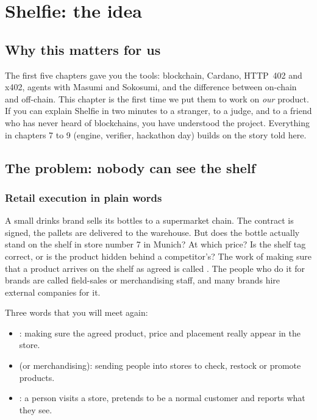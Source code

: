 \chapter{Shelfie: the idea}

\section*{Why this matters for us}
The first five chapters gave you the tools: blockchain, Cardano, HTTP~402 and x402, agents with Masumi and Sokosumi, and the difference between on-chain and off-chain. This chapter is the first time we put them to work on \emph{our} product. If you can explain Shelfie in two minutes to a stranger, to a judge, and to a friend who has never heard of blockchains, you have understood the project. Everything in chapters 7 to 9 (engine, verifier, hackathon day) builds on the story told here.

\section{The problem: nobody can see the shelf}

\subsection{Retail execution in plain words}
A small drinks brand sells its bottles to a supermarket chain. The contract is signed, the pallets are delivered to the warehouse. But does the bottle actually stand on the shelf in store number 7 in Munich? At which price? Is the shelf tag correct, or is the product hidden behind a competitor's? The work of making sure that a product arrives on the shelf as agreed is called . The people who do it for brands are called field-sales or merchandising staff, and many brands hire external companies for it.

Three words that you will meet again:
\begin{itemize}
  \item {}: making sure the agreed product, price and placement really appear in the store.
  \item {} (or merchandising): sending people into stores to check, restock or promote products.
  \item {}: a person visits a store, pretends to be a normal customer and reports what they see.
\end{itemize}

